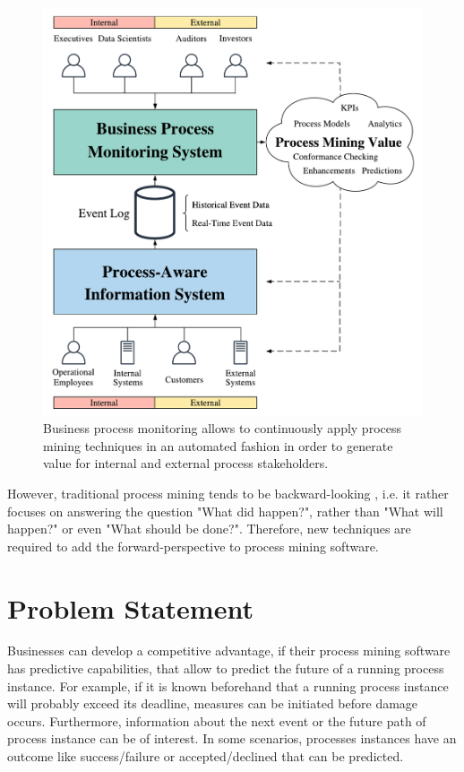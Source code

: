 \begin{figure}[htbp!]
	\centering
	\includegraphics[width=\textwidth]{figures/process-monitoring}
	\caption{Business process monitoring allows to continuously apply process mining techniques in an automated fashion in order to generate value for internal and external process stakeholders.}
	\label{fig:process-monitoring}
\end{figure}

However, traditional process mining tends to be backward-looking  \cite{DBLP:conf/scsc/Aalst18}, i.e. it rather focuses on answering the question "What did happen?", rather than "What will happen?" or even "What should be done?".
Therefore, new techniques are required to add the forward-perspective to process mining software.

\section{Problem Statement}

Businesses can develop a competitive advantage, if their process mining software has predictive capabilities, that allow to predict the future of a running process instance.
For example, if it is known beforehand that a running process instance will probably exceed its deadline, measures can be initiated before damage occurs.
Furthermore, information about the next event or the future path of process instance can be of interest.
In some scenarios, processes instances have an outcome like success/failure or accepted/declined that can be predicted.

